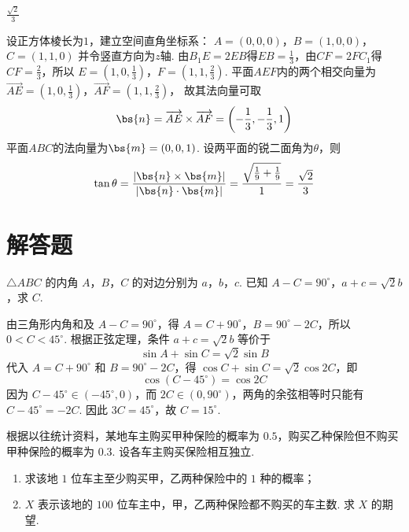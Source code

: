 \begin{answer}
\(\frac{\sqrt{2}}{3}\)
\end{answer}

\begin{solution}
设正方体棱长为\(1\)，建立空间直角坐标系：
\(A=(0,0,0)\)，\(B=(1,0,0)\)，\(C=(1,1,0)\)
并令竖直方向为\(z\)轴. 由\(B_1E=2EB\)得\(EB=\frac13\)，由\(CF=2FC_1\)得\(CF=\frac23\)，所以
\(E=\left(1,0,\frac13\right)\)，\(F=\left(1,1,\frac23\right)\).
平面\(AEF\)内的两个相交向量为
\(\overrightarrow{AE}=\left(1,0,\frac13\right)\)，\(\overrightarrow{AF}=\left(1,1,\frac23\right)\)，
故其法向量可取
\[
\bs{n}=\overrightarrow{AE}\times\overrightarrow{AF}=\left(-\frac13,-\frac13,1\right)
\]
平面\(ABC\)的法向量为\(\bs{m}=(0,0,1)\). 设两平面的锐二面角为\(\theta\)，则
\[
\tan\theta=\frac{|\bs{n}\times\bs{m}|}{|\bs{n}\cdot\bs{m}|}
=\frac{\sqrt{\frac19+\frac19}}{1}=\frac{\sqrt2}{3}
\]
\end{solution}


\section{解答题}

\begin{problem}
\(\triangle ABC\) 的内角 \(A\)，\(B\)，\(C\) 的对边分别为 \(a\)，\(b\)，\(c\). 已知 \(A - C = 90^{\circ}\)，\(a + c = \sqrt{2} b\)，求 \(C\).
\end{problem}

\begin{solution}
由三角形内角和及 \(A-C=90^{\circ}\)，得 \(A=C+90^{\circ}\)，\(B=90^{\circ}-2C\)，所以 \(0<C<45^{\circ}\). 根据正弦定理，条件 \(a+c=\sqrt{2}b\) 等价于
\[
\sin A+\sin C=\sqrt{2}\sin B
\]
代入 \(A=C+90^{\circ}\) 和 \(B=90^{\circ}-2C\)，得 \(\cos C+\sin C=\sqrt{2}\cos 2C\)，即
\[
\cos\left(C-45^{\circ}\right)=\cos 2C
\]
因为 \(C-45^{\circ}\in(-45^{\circ},0)\)，而 \(2C\in(0,90^{\circ})\)，两角的余弦相等时只能有 \(C-45^{\circ}=-2C\). 因此 \(3C=45^{\circ}\)，故 \(C=15^{\circ}\).
\end{solution}


\begin{problem}
根据以往统计资料，某地车主购买甲种保险的概率为 \(0.5\)，购买乙种保险但不购买甲种保险的概率为 \(0.3\). 设各车主购买保险相互独立.
\begin{enumerate}
\item 求该地 \(1\) 位车主至少购买甲，乙两种保险中的 \(1\) 种的概率；
\item \(X\) 表示该地的 \(100\) 位车主中，甲，乙两种保险都不购买的车主数. 求 \(X\) 的期望.
\end{enumerate}
\end{problem}

